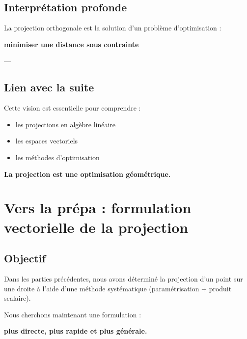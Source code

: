 \documentclass[11pt,a4paper]{article}
\begin{document}
\subsection{Interprétation profonde}

La projection orthogonale est la solution d’un problème d’optimisation :

\begin{center}
\textbf{minimiser une distance sous contrainte}
\end{center}

---

\subsection{Lien avec la suite}

Cette vision est essentielle pour comprendre :

\begin{itemize}
\item les projections en algèbre linéaire
\item les espaces vectoriels
\item les méthodes d’optimisation
\end{itemize}

\bigskip

\begin{center}
\textbf{La projection est une optimisation géométrique.}
\end{center}

\section{Vers la prépa : formulation vectorielle de la projection}

\subsection{Objectif}

Dans les parties précédentes, nous avons déterminé la projection d’un point sur une droite
à l’aide d’une méthode systématique (paramétrisation + produit scalaire).

\bigskip

Nous cherchons maintenant une formulation :

\begin{center}
\textbf{plus directe, plus rapide et plus générale.}
\end{center}
\end{document}
